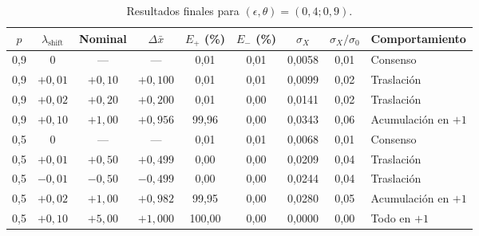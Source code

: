 \documentclass[11pt,a4paper]{article}
\begin{document}
\begin{table}[htbp]
\centering
\caption{Resultados finales para $(\epsilon,\theta)=(0{,}4;0{,}9)$.}
\label{tab:shift-esc-04}
\small
\setlength{\tabcolsep}{5pt}
\begin{tabular}{ccccccccl}
\toprule
$p$ & $\lambda_{\mathrm{shift}}$ & Nominal & $\Delta\bar{x}$ & $E_{+}$ (\%) & $E_{-}$ (\%) & $\sigma_X$ & $\sigma_X/\sigma_0$ & Comportamiento \\
\midrule
0,9 & $0$        & ---        & ---        & 0,01   & 0,01 & 0,0058 & 0,01 & Consenso \\
0,9 & $+0{,}01$  & $+0{,}10$  & $+0{,}100$ & 0,01   & 0,01 & 0,0099 & 0,02 & Traslación \\
0,9 & $+0{,}02$  & $+0{,}20$  & $+0{,}200$ & 0,01   & 0,00 & 0,0141 & 0,02 & Traslación \\
0,9 & $+0{,}10$  & $+1{,}00$  & $+0{,}956$ & 99,96  & 0,00 & 0,0343 & 0,06 & Acumulación en $+1$ \\
0,5 & $0$        & ---        & ---        & 0,01   & 0,01 & 0,0068 & 0,01 & Consenso \\
0,5 & $+0{,}01$  & $+0{,}50$  & $+0{,}499$ & 0,00   & 0,00 & 0,0209 & 0,04 & Traslación \\
0,5 & $-0{,}01$  & $-0{,}50$  & $-0{,}499$ & 0,00   & 0,00 & 0,0244 & 0,04 & Traslación \\
0,5 & $+0{,}02$  & $+1{,}00$  & $+0{,}982$ & 99,95  & 0,00 & 0,0280 & 0,05 & Acumulación en $+1$ \\
0,5 & $+0{,}10$  & $+5{,}00$  & $+1{,}000$ & 100,00 & 0,00 & 0,0000 & 0,00 & Todo en $+1$ \\
\bottomrule
\end{tabular}
\end{table}
\end{document}
